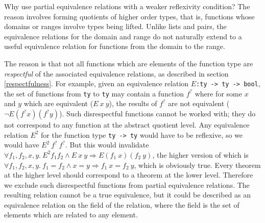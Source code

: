 \documentclass[envcountsame,runningheads]{llncs}
\newcommand{\quotient}{partial equivalence}
\begin{document}
Why use \quotient{} relations with a weaker reflexivity condition?
The reason involves forming quotients of higher order types, that is,
functions whose domains or ranges involve types being lifted.  Unlike lists
and pairs, the equivalence relations for the domain and range do not
naturally extend to a useful equivalence relation for functions
from the domain to the range.  

The reason is that not all functions which are elements of the function
type are {\it respectful\/} of the associated equivalence relations,
as described in section {\ref{respectfulness}}. 
For example, given an equivalence relation $E${\tt :ty -> ty -> bool},
the set of functions from {\tt ty} to {\tt ty} may contain a function
$f^?$ where for some $x$ and $y$
which are equivalent
($E\ x\ y$), the results of $f^?$ are not equivalent ($\neg E (f^? x) (f^? y)$).
Such disrespectful functions cannot be worked with; they do not 
correspond to any function at the abstract quotient level.
Any equivalence relation $E^2$ for the function type {\tt ty -> ty} would
have to be reflexive, so we would have $E^2\ f^?\ f^?$.
But this would invalidate
$\forall f_1, f_2, x, y.\ E^2 f_1 f_2 \wedge E\ x\ y \Rightarrow E (f_1\ x) (f_2\ y)$,
the higher version of which is
$\forall f_1, f_2, x, y.\ f_1 = f_2 \wedge x = y \Rightarrow f_1\ x = f_2\ y$,
which is obviously true.
Every theorem at the higher level should correspond to a theorem at
the lower level.
Therefore we exclude such disrespectful functions
from \quotient{} relations.
The resulting
relation cannot be
a true equivalence,
but it could be described as an equivalence relation on the field of
the relation, where the field is the set of elements which
are related to any element.
\end{document}
